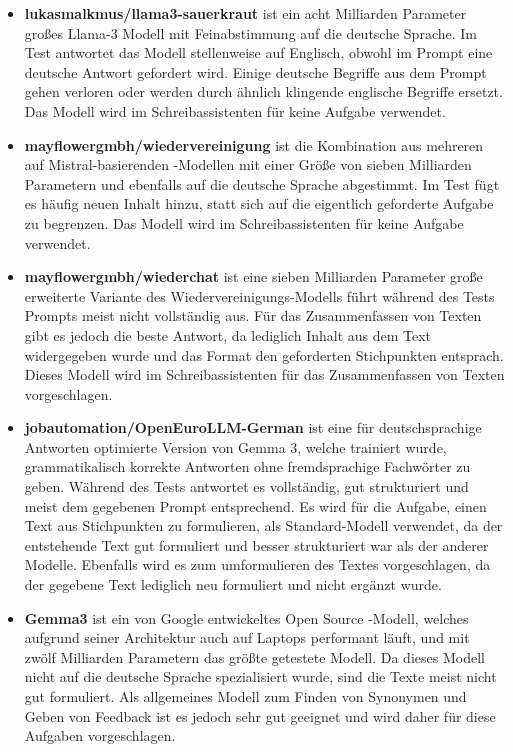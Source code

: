 \documentclass[../main.tex]{subfiles}
\begin{document}
\begin{itemize}

\item \textbf{lukasmalkmus/llama3-sauerkraut} ist ein acht Milliarden Parameter großes Llama-3 Modell mit Feinabstimmung auf die deutsche Sprache\cite{sauerkraut}. Im Test antwortet das Modell stellenweise auf Englisch, obwohl im Prompt eine deutsche Antwort gefordert wird. Einige deutsche Begriffe aus dem Prompt gehen verloren oder werden durch ähnlich klingende englische Begriffe ersetzt. Das Modell wird im Schreibassistenten für keine Aufgabe verwendet.

\item \textbf{mayflowergmbh/wiedervereinigung} ist die Kombination aus mehreren auf Mistral-basierenden -Modellen mit einer Größe von sieben Milliarden Parametern und ebenfalls auf die deutsche Sprache abgestimmt\cite{wiedervereinigung}. Im Test fügt es häufig neuen Inhalt hinzu, statt sich auf die eigentlich geforderte Aufgabe zu begrenzen. Das Modell wird im Schreibassistenten für keine Aufgabe verwendet.

\item \textbf{mayflowergmbh/wiederchat} ist eine sieben Milliarden Parameter große erweiterte Variante des Wiedervereinigungs-Modells führt während des Tests Prompts meist nicht vollständig aus\cite{wiederchat}. Für das Zusammenfassen von Texten gibt es jedoch die beste Antwort, da lediglich Inhalt aus dem Text widergegeben wurde und das Format den geforderten Stichpunkten entsprach. Dieses Modell wird im Schreibassistenten für das Zusammenfassen von Texten vorgeschlagen.

\item \textbf{jobautomation/OpenEuroLLM-German} ist eine für deutschsprachige Antworten optimierte Version von Gemma 3, welche trainiert wurde, grammatikalisch korrekte Antworten ohne fremdsprachige Fachwörter zu geben\cite{openeurollm}. Während des Tests antwortet es vollständig, gut strukturiert und meist dem gegebenen Prompt entsprechend. Es wird für die Aufgabe, einen Text aus Stichpunkten zu formulieren, als Standard-Modell verwendet, da der entstehende Text gut formuliert und besser strukturiert war als der anderer Modelle. Ebenfalls wird es zum umformulieren des Textes vorgeschlagen, da der gegebene Text lediglich neu formuliert und nicht ergänzt wurde.  

\item \textbf{Gemma3} ist ein von Google entwickeltes Open Source -Modell, welches aufgrund seiner Architektur auch auf Laptops performant läuft, und mit zwölf Milliarden Parametern das größte getestete Modell\cite{gemma3}. Da dieses Modell nicht auf die deutsche Sprache spezialisiert wurde, sind die Texte meist nicht gut formuliert. Als allgemeines Modell zum Finden von Synonymen und Geben von Feedback ist es jedoch sehr gut geeignet und wird daher für diese Aufgaben vorgeschlagen. 

\end{itemize}
\end{document}

